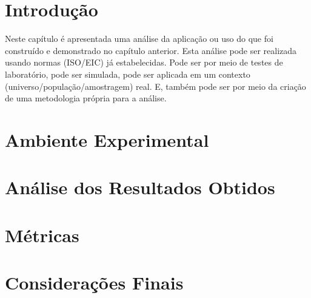 \section{Introdução}
Neste capítulo é apresentada uma análise da aplicação ou uso do que foi construído e demonstrado no capítulo anterior. Esta análise pode ser realizada usando normas (ISO/EIC) já estabelecidas. Pode ser por meio de testes de laboratório, pode ser simulada, pode ser aplicada em um contexto (universo/população/amostragem) real. E, também pode ser por meio da criação de uma metodologia própria para a análise.

\section{Ambiente Experimental}

\section{Análise dos Resultados Obtidos}

\section{Métricas}

\section{Considerações Finais}




